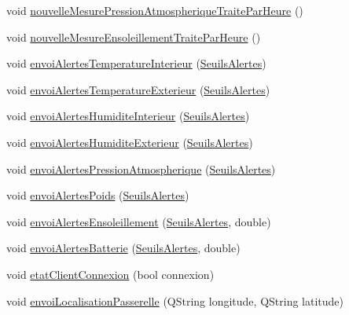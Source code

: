 \begin{DoxyCompactItemize}
\item 
void \hyperlink{class_ruche_a7948d81996c196eeb0f20dc203a52e75}{nouvelle\+Mesure\+Pression\+Atmospherique\+Traite\+Par\+Heure} ()
\item 
void \hyperlink{class_ruche_adab3ce6ee33b3e6306aa7dc4f2ca1f20}{nouvelle\+Mesure\+Ensoleillement\+Traite\+Par\+Heure} ()
\item 
void \hyperlink{class_ruche_ac2f37831cb8c70ac4df2a3ac805b728b}{envoi\+Alertes\+Temperature\+Interieur} (\hyperlink{parametres_8h_aaa6de8207c94675264c90b10b613368d}{Seuils\+Alertes})
\item 
void \hyperlink{class_ruche_a5bb36a4bb9692a744a1b7ebc5fc59f57}{envoi\+Alertes\+Temperature\+Exterieur} (\hyperlink{parametres_8h_aaa6de8207c94675264c90b10b613368d}{Seuils\+Alertes})
\item 
void \hyperlink{class_ruche_a0f1dfe6d0a677341e29296e044d91975}{envoi\+Alertes\+Humidite\+Interieur} (\hyperlink{parametres_8h_aaa6de8207c94675264c90b10b613368d}{Seuils\+Alertes})
\item 
void \hyperlink{class_ruche_abef2fd2fdeaee8bc19fa1ce13b32f4d0}{envoi\+Alertes\+Humidite\+Exterieur} (\hyperlink{parametres_8h_aaa6de8207c94675264c90b10b613368d}{Seuils\+Alertes})
\item 
void \hyperlink{class_ruche_a97ae09a121944f7df48fb38bd049b878}{envoi\+Alertes\+Pression\+Atmospherique} (\hyperlink{parametres_8h_aaa6de8207c94675264c90b10b613368d}{Seuils\+Alertes})
\item 
void \hyperlink{class_ruche_a21d7f05b696896b1a3c7e20c396aaf23}{envoi\+Alertes\+Poids} (\hyperlink{parametres_8h_aaa6de8207c94675264c90b10b613368d}{Seuils\+Alertes})
\item 
void \hyperlink{class_ruche_aa3d500a4a0e5ed60da000af15000505e}{envoi\+Alertes\+Ensoleillement} (\hyperlink{parametres_8h_aaa6de8207c94675264c90b10b613368d}{Seuils\+Alertes}, double)
\item 
void \hyperlink{class_ruche_ac76ce5692e134b365330d91af2a6b4e7}{envoi\+Alertes\+Batterie} (\hyperlink{parametres_8h_aaa6de8207c94675264c90b10b613368d}{Seuils\+Alertes}, double)
\item 
void \hyperlink{class_ruche_a932b2c69dbe919afed9549d5666b2736}{etat\+Client\+Connexion} (bool connexion)
\item 
void \hyperlink{class_ruche_a2a0f122bfd939419f40facf41e91fe30}{envoi\+Localisation\+Passerelle} (Q\+String longitude, Q\+String latitude)
\end{DoxyCompactItemize}
